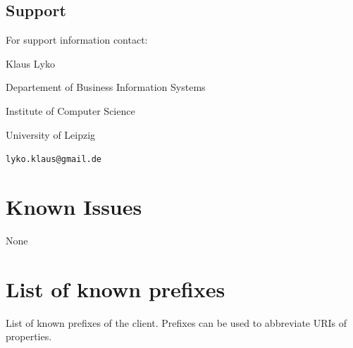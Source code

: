 \documentclass{article}
\begin{document}
\subsection{Support}
For support information  contact:

Klaus Lyko

Departement of Business Information Systems

Institute of Computer Science

University of Leipzig

\verb#lyko.klaus@gmail.de#

\section{Known Issues}
None

\appendix
\section{List of known prefixes}
List of known prefixes of the client. Prefixes can be used to abbreviate URIs of properties.
\end{document}
